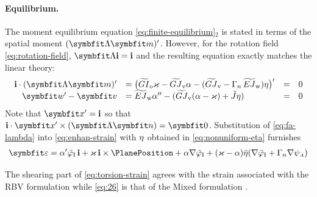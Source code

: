 \paragraph{Equilibrium.}
The moment equilibrium equation \eqref{eq:finite-equilibrium}$_2$ is stated in terms of the spatial moment \((\FrameRotation \bm{m})'\). 
However, for the rotation field \eqref{eq:rotation-field}, \(\FrameRotation\FrameBasis = \FrameBasis\) and the resulting equation exactly matches the linear theory:
\begin{equation}
\begin{array}{rlcl}
\FrameBasis \cdot (\FrameRotation \bm{m})' &= \bigl(\GIo \Twist - \GJv \alpha - (\GJv - \EnhanConstFA \, \EJw) \EnhanParam \bigr)' &=& 0 \\
\bm{w}' - \bm{v} &= \EJw \alpha'' - (\GJv (\alpha - \Twist) + \tilde{J} \EnhanParam) &=& 0
\end{array}
\label{eq:torsion-equilibrium}
\end{equation}
Note that \(\bm{x}' = \FrameBasis\) so that \(\FrameBasis\cdot \bm{x}' \times (\FrameRotation \bm{n})= \bm{0}\).
%
Substitution of \eqref{eq:fa-lambda} into \eqref{eq:enhan-strain} with \({\eta}\) obtained in \eqref{eq:nonuniform-eta} furnishes
%
\begin{equation}
\begin{aligned}
\bm{\varepsilon} 
&= \alpha' \WarpTwistIesan\, \FrameBasis + \Twist\, \FrameBasis \times \PlanePosition + \alpha \nabla \WarpTwistIesan + (\Twist - \alpha) \bar{\eta} (\nabla \WarpTwistIesan + \EnhanConstFA \nabla \WarpFA) \\
\end{aligned}
\label{eq:26}
\end{equation}
\begin{remark}
The shearing part of 
\eqref{eq:torsion-strain} agrees with the strain associated with the RBV formulation \citep[eq. 108]{armero2021modeling} while \eqref{eq:26} is that of the Mixed formulation \citep[eq. 161]{armero2021modeling}.
\end{remark}
%

